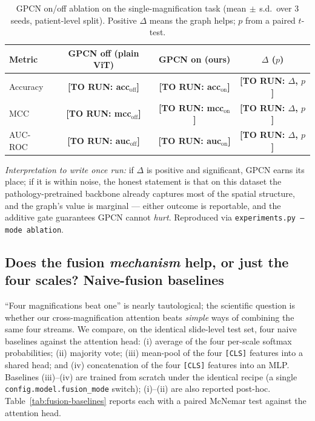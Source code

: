 \documentclass[11pt]{article}
\newcommand{\cls}{\texttt{[CLS]}}
\newcommand{\todo}[1]{{\color{red}\textbf{[TO RUN: #1]}}}
\begin{document}
\begin{table}[t]
\centering
\caption{GPCN on/off ablation on the single-magnification task
(mean$\,\pm\,$s.d.\ over 3 seeds, patient-level split). Positive $\Delta$ means the
graph helps; $p$ from a paired $t$-test.}
\label{tab:gpcn}
\small
\begin{tabular}{@{}lccc@{}}
\toprule
Metric & GPCN off (plain ViT) & GPCN on (ours) & $\Delta$ ($p$) \\
\midrule
Accuracy & \todo{acc$_\text{off}$} & \todo{acc$_\text{on}$} & \todo{$\Delta$, $p$} \\
MCC      & \todo{mcc$_\text{off}$} & \todo{mcc$_\text{on}$} & \todo{$\Delta$, $p$} \\
AUC-ROC  & \todo{auc$_\text{off}$} & \todo{auc$_\text{on}$} & \todo{$\Delta$, $p$} \\
\bottomrule
\end{tabular}
\end{table}

\noindent\emph{Interpretation to write once run:} if $\Delta$ is positive and
significant, GPCN earns its place; if it is within noise, the honest statement is
that on this dataset the pathology-pretrained backbone already captures most of the
spatial structure, and the graph's value is marginal — either outcome is
reportable, and the additive gate guarantees GPCN cannot \emph{hurt}. Reproduced
via \texttt{experiments.py --mode ablation}.

\subsection{Does the fusion \emph{mechanism} help, or just the four scales?
Naive-fusion baselines}
\label{sec:fusion-baselines}
``Four magnifications beat one'' is nearly tautological; the scientific question is
whether our cross-magnification attention beats \emph{simple} ways of combining the
same four streams. We compare, on the identical slide-level test set, four naive
baselines against the attention head: (i) average of the four per-scale softmax
probabilities; (ii) majority vote; (iii) mean-pool of the four \cls{} features into
a shared head; and (iv) concatenation of the four \cls{} features into an MLP.
Baselines (iii)--(iv) are trained from scratch under the identical recipe (a single
\texttt{config.model.fusion\_mode} switch); (i)--(ii) are also reported post-hoc.
Table~\ref{tab:fusion-baselines} reports each with a paired McNemar test against the
attention head.
\end{document}
